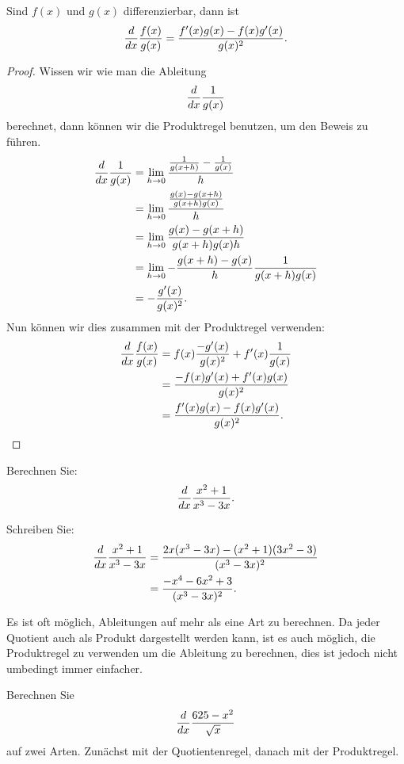 \begin{mainTheorem}\label{theorem:quotient-rule}
Sind $f(x)$ und $g(x)$ differenzierbar, dann ist
\[
\frac{d}{dx} \frac{f(x)}{g(x)} = \frac{f'(x)g(x)-f(x)g'(x)}{g(x)^2}.
\]
\end{mainTheorem}
\begin{proof}
Wissen wir wie man die Ableitung
\[
\frac{d}{dx} \frac{1}{g(x)}
\]
berechnet, dann können wir die Produktregel benutzen, um den Beweis zu führen.
\begin{align*}
\frac{d}{dx}\frac{1}{g(x)}&=\lim_{h\to0} \frac{\frac{1}{g(x+h)}-\frac{1}{g(x)}}{h} \\
&=\lim_{h\to0} \frac{\frac{g(x)-g(x+h)}{g(x+h)g(x)}}{h} \\
&=\lim_{h\to0} \frac{g(x)-g(x+h)}{g(x+h)g(x)h} \\
&=\lim_{h\to0} -\frac{g(x+h)-g(x)}{h} \frac{1}{g(x+h)g(x)} \\
&=-\frac{g'(x)}{g(x)^2}.
\end{align*}
Nun können wir dies zusammen mit der Produktregel verwenden:
\begin{align*}
\frac{d}{dx}\frac{f(x)}{g(x)} &=f(x)\frac{-g'(x)}{g(x)^2}+f'(x)\frac{1}{g(x)}\\
&=\frac{-f(x)g'(x)+f'(x)g(x)}{g(x)^2}\\
&=\frac{f'(x)g(x)-f(x)g'(x)}{g(x)^2}.
\end{align*}

\end{proof}


\begin{example}
Berechnen Sie:
\[
\frac{d}{dx} \frac{x^2+1}{x^3-3x}.
\]
\end{example}

\begin{solution}
Schreiben Sie:
\begin{align*}
\frac{d}{dx} \frac{x^2+1}{x^3-3x} &= \frac{2x(x^3-3x)-(x^2+1)(3x^2-3)}{(x^3-3x)^2}\\
&=\frac{-x^4-6x^2+3}{(x^3-3x)^2}.
\end{align*}
\end{solution}

Es ist oft möglich, Ableitungen auf mehr als eine Art zu berechnen. Da jeder Quotient auch als Produkt dargestellt werden kann, ist es auch möglich, die Produktregel zu verwenden um die Ableitung zu berechnen, dies ist jedoch nicht umbedingt immer einfacher.

\begin{example}
Berechnen Sie 
\[
\frac{d}{dx} \frac{625-x^2}{\sqrt{x}}
\] 
auf zwei Arten. Zunächst mit der Quotientenregel, danach mit der Produktregel.
\end{example}

